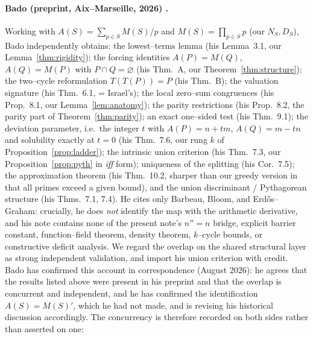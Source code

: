 \documentclass[11pt]{article}
\theoremstyle{definition}
\begin{document}
\paragraph{Bado (preprint, Aix--Marseille, 2026) \cite{Bado2026}.}
Working with $A(S)=\sum_{p\in S}M(S)/p$ and $M(S)=\prod_{p\in S}p$ (our $N_S,D_S$), Bado independently
obtains: the lowest--terms lemma (his Lemma~3.1, our Lemma~\ref{thm:rigidity}); the forcing identities
$A(P)=M(Q)$, $A(Q)=M(P)$ with $P\cap Q=\varnothing$ (his Thm.~A, our Theorem~\ref{thm:structure}); the
two--cycle reformulation $T(T(P))=P$ (his Thm.~B); the valuation signature (his Thm.~6.1, = Israel's);
the local zero--sum congruences (his Prop.~8.1, our Lemma~\ref{lem:anatomy}); the parity restrictions
(his Prop.~8.2, the parity part of Theorem~\ref{thm:parity}); an exact one--sided test (his Thm.~9.1); the deviation parameter, i.e.\ the integer $t$ with
$A(P)=n+tm$, $A(Q)=m-tn$ and solubility exactly at $t=0$ (his Thm.~7.6, our rung $k$ of
Proposition~\ref{prop:ladder}); the intrinsic union criterion (his Thm.~7.3, our
Proposition~\ref{prop:pyth} in \emph{iff} form); uniqueness of the splitting (his Cor.~7.5);
the approximation theorem (his Thm.~10.2, sharper than our greedy version in that all primes exceed a
given bound), and the union discriminant / Pythagorean structure (his Thms.~7.1, 7.4). He cites only
Barbeau, Bloom, and Erd\H{o}s--Graham: crucially, he does \emph{not} identify the map with the
arithmetic derivative, and his note contains none of the present note's $n''=n$ bridge, explicit
barrier constant, function--field theorem, density theorem, $k$--cycle bounds, or constructive
deficit analysis. We regard the overlap on the shared structural layer as strong independent
validation, and import his union criterion with credit. Bado has confirmed this account in
correspondence (August 2026): he agrees that the results listed above were present in his
preprint and that the overlap is concurrent and independent, and he has confirmed the
identification $A(S)=M(S)'$, which he had not made, and is revising his historical discussion
accordingly. The concurrency is therefore recorded on both sides rather than asserted on one:
\end{document}

